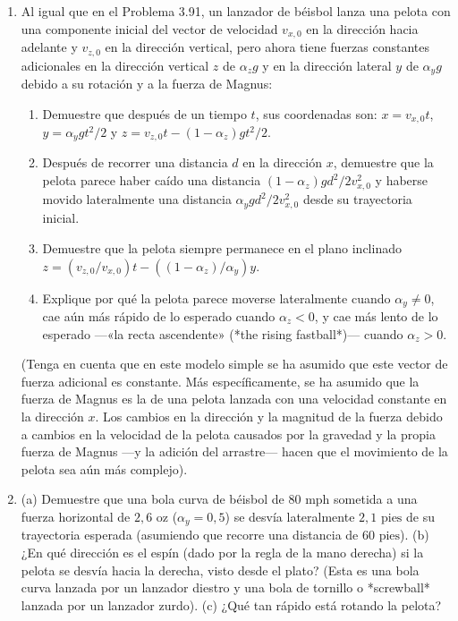 \documentclass[12pt]{book}
\begin{document}
\begin{enumerate}
\item[3.110] Al igual que en el Problema 3.91, un lanzador de béisbol lanza una pelota con una componente inicial del vector de velocidad $v_{x,0}$ en la dirección hacia adelante y $v_{z,0}$ en la dirección vertical, pero ahora tiene fuerzas constantes adicionales en la dirección vertical $z$ de $\alpha_z g$ y en la dirección lateral $y$ de $\alpha_y g$ debido a su rotación y a la fuerza de Magnus:
\begin{enumerate}
\item[(a)] Demuestre que después de un tiempo $t$, sus coordenadas son: $x = v_{x,0}t$, $y = \alpha_y g t^2/2$ y $z = v_{z,0}t - (1 - \alpha_z)g t^2/2$.
\item[(b)] Después de recorrer una distancia $d$ en la dirección $x$, demuestre que la pelota parece haber caído una distancia $(1 - \alpha_z)gd^2/2v_{x,0}^2$ y haberse movido lateralmente una distancia $\alpha_y gd^2/2v_{x,0}^2$ desde su trayectoria inicial.
\item[(c)] Demuestre que la pelota siempre permanece en el plano inclinado $z = (v_{z,0}/v_{x,0})t - ((1 - \alpha_z)/\alpha_y)y$.
\item[(d)] Explique por qué la pelota parece moverse lateralmente cuando $\alpha_y \neq 0$, cae aún más rápido de lo esperado cuando $\alpha_z < 0$, y cae más lento de lo esperado ---«la recta ascendente» (*the rising fastball*)--- cuando $\alpha_z > 0$.
\end{enumerate}
(Tenga en cuenta que en este modelo simple se ha asumido que este vector de fuerza adicional es constante. Más específicamente, se ha asumido que la fuerza de Magnus es la de una pelota lanzada con una velocidad constante en la dirección $x$. Los cambios en la dirección y la magnitud de la fuerza debido a cambios en la velocidad de la pelota causados por la gravedad y la propia fuerza de Magnus ---y la adición del arrastre--- hacen que el movimiento de la pelota sea aún más complejo).

\item[3.111] (a) Demuestre que una bola curva de béisbol de $80\text{ mph}$ sometida a una fuerza horizontal de $2{,}6\text{ oz}$ ($\alpha_y = 0{,}5$) se desvía lateralmente $2{,}1\text{ pies}$ de su trayectoria esperada (asumiendo que recorre una distancia de $60\text{ pies}$).
\newline
(b) ¿En qué dirección es el espín (dado por la regla de la mano derecha) si la pelota se desvía hacia la derecha, visto desde el plato? (Esta es una bola curva lanzada por un lanzador diestro y una bola de tornillo o *screwball* lanzada por un lanzador zurdo).
\newline
(c) ¿Qué tan rápido está rotando la pelota?


\end{enumerate}
\end{document}
